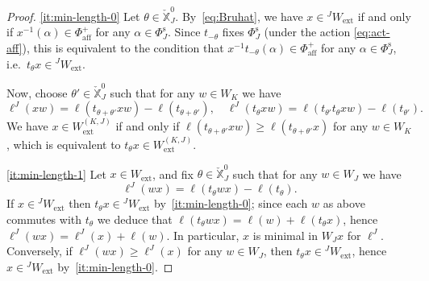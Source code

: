 \documentclass[11pt]{amsart}
\numberwithin{equation}{section}
\theoremstyle{plain}
\theoremstyle{definition}
\newcommand{\X}{{\mathbb X}}
\newcommand{\Xd}{\check{\X}}
\newcommand{\Phis}{\Phi^{\mathrm{s}}}
\newcommand{\ex}{\mathrm{ext}}
\newcommand{\af}{\mathrm{aff}}
\newcommand{\comp}{\mathrm{c}}
\begin{document}
\begin{proof}
\eqref{it:min-length-0}
Let $\theta \in \Xd_J^0$.
By~\eqref{eq:Bruhat}, we have $x\in {}^JW_\ex$ if and only if $x^{-1}(\alpha)\in \Phi^+_\af$ for any $\alpha\in \Phis_J$. 
Since $t_{-\theta}$ fixes $\Phis_J$ (under the action \eqref{eq:act-aff}), 
this is equivalent to the condition that $x^{-1}t_{-\theta}(\alpha)\in \Phi^+_\af$ for any $\alpha\in \Phis_J$, i.e.~$t_\theta x \in {}^J W_\ex$.

Now, choose $\theta' \in \Xd_J^0$ such that for any $w \in W_K$ we have
\[
\ell^J(xw) = \ell(t_{\theta+\theta'} xw) - \ell(t_{\theta+\theta'}), \quad \ell^J( t_{\theta}xw) = \ell(t_{\theta'} t_{\theta}xw) - \ell (t_{\theta'}).
\]
We have $x \in W_\ex^{(K,J)}$ if and only if $\ell(t_{\theta+\theta'} xw) \geq \ell(t_{\theta+\theta'} x)$ for any $w \in W_K$, which is equivalent to $t_\theta x \in W_\ex^{(K,J)}$.

\eqref{it:min-length-1}
Let $x \in W_\ex$, and fix $\theta\in \Xd_J^0$ 
such that for any $w \in W_J$ we have
\[
\ell^J(wx) = \ell(t_\theta wx) - \ell(t_\theta).
\]
If $x \in {}^J W_\ex$ then $t_\theta x \in {}^J W_\ex$ by~\eqref{it:min-length-0}; since each $w$ as above commutes with $t_\theta$ we deduce that $\ell(t_\theta wx)=\ell(w) + \ell(t_\theta x)$, hence $\ell^J(wx)=\ell^J(x)+\ell(w)$. In particular, $x$ is minimal in $W_J x$ for $\ell^J$. Conversely, if $\ell^J(wx) \geq \ell^J(x)$ for any $w \in W_J$, then $t_\theta x \in {}^J W_\ex$, hence $x \in {}^J W_\ex$ by~\eqref{it:min-length-0}.




\end{proof}
\end{document}
